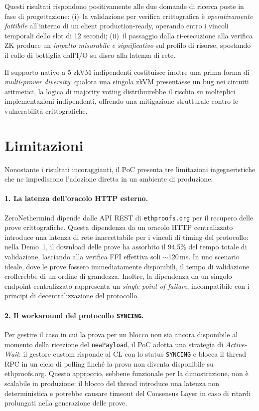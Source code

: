 \documentclass[12pt,a4paper,openright,twoside]{report}
\begin{document}
Questi risultati rispondono positivamente alle due domande di ricerca poste in fase di progettazione: (i)~la validazione per verifica crittografica è \textit{operativamente fattibile} all'interno di un client production-ready, operando entro i vincoli temporali dello slot di 12 secondi; (ii)~il passaggio dalla ri-esecuzione alla verifica ZK produce un \textit{impatto misurabile e significativo} sul profilo di risorse, spostando il collo di bottiglia dall'I/O su disco alla latenza di rete.

Il supporto nativo a 5 zkVM indipendenti costituisce inoltre una prima forma di \textit{multi-prover diversity}: qualora una singola zkVM presentasse un bug nei circuiti aritmetici, la logica di majority voting distribuirebbe il rischio su molteplici implementazioni indipendenti, offrendo una mitigazione strutturale contro le vulnerabilità crittografiche.


\section{Limitazioni}

Nonostante i risultati incoraggianti, il PoC presenta tre limitazioni ingegneristiche che ne impediscono l'adozione diretta in un ambiente di produzione.

\paragraph{1. La latenza dell'oracolo HTTP esterno.}
ZeroNethermind dipende dalle API REST di \texttt{ethproofs.org} per il recupero delle prove crittografiche. Questa dipendenza da un oracolo HTTP centralizzato introduce una latenza di rete inaccettabile per i vincoli di timing del protocollo: nella Demo~1, il download delle prove ha assorbito il 94,5\% del tempo totale di validazione, lasciando alla verifica FFI effettiva soli $\sim$120\,ms. In uno scenario ideale, dove le prove fossero immediatamente disponibili, il tempo di validazione crollerebbe di un ordine di grandezza. Inoltre, la dipendenza da un singolo endpoint centralizzato rappresenta un \textit{single point of failure}, incompatibile con i principi di decentralizzazione del protocollo.

\paragraph{2. Il workaround del protocollo \texttt{SYNCING}.}
Per gestire il caso in cui la prova per un blocco non sia ancora disponibile al momento della ricezione del \texttt{newPayload}, il PoC adotta una strategia di \textit{Active-Wait}: il gestore custom risponde al CL con lo status \texttt{SYNCING} e blocca il thread RPC in un ciclo di polling finché la prova non diventa disponibile su ethproofs.org. Questo approccio, sebbene funzionale per la dimostrazione, non è scalabile in produzione: il blocco del thread introduce una latenza non deterministica e potrebbe causare timeout del Consensus Layer in caso di ritardi prolungati nella generazione delle prove.
\end{document}
